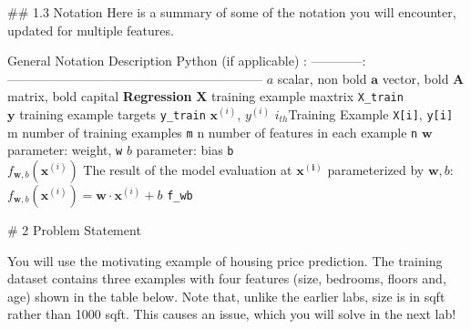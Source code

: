 \documentclass[11pt]{article}
\begin{document}
    \#\# 1.3 Notation Here is a summary of some of the notation you will
encounter, updated for multiple features.

\textbar General Notation \textbar{} Description\textbar{} Python (if
applicable) \textbar{} \textbar: ------------\textbar:
------------------------------------------------------------\textbar\textbar{}
\textbar{} \(a\) \textbar{} scalar, non bold \textbar\textbar{}
\textbar{} \(\mathbf{a}\) \textbar{} vector, bold \textbar\textbar{}
\textbar{} \(\mathbf{A}\) \textbar{} matrix, bold capital
\textbar\textbar{} \textbar{} \textbf{Regression} \textbar{} \textbar{}
\textbar{} \textbar{} \textbar{} \(\mathbf{X}\) \textbar{} training
example maxtrix \textbar{} \texttt{X\_train} \textbar{}\\
\textbar{} \(\mathbf{y}\) \textbar{} training example targets \textbar{}
\texttt{y\_train} \textbar{} \(\mathbf{x}^{(i)}\), \(y^{(i)}\)
\textbar{} \(i_{th}\)Training Example \textbar{} \texttt{X{[}i{]}},
\texttt{y{[}i{]}}\textbar{} \textbar{} m \textbar{} number of training
examples \textbar{} \texttt{m}\textbar{} \textbar{} n \textbar{} number
of features in each example \textbar{} \texttt{n}\textbar{} \textbar{}
\(\mathbf{w}\) \textbar{} parameter: weight, \textbar{} \texttt{w}
\textbar{} \textbar{} \(b\) \textbar{} parameter: bias \textbar{}
\texttt{b} \textbar{}\\
\textbar{} \(f_{\mathbf{w},b}(\mathbf{x}^{(i)})\) \textbar{} The result
of the model evaluation at \(\mathbf{x^{(i)}}\) parameterized by
\(\mathbf{w},b\):
\(f_{\mathbf{w},b}(\mathbf{x}^{(i)}) = \mathbf{w} \cdot \mathbf{x}^{(i)}+b\)
\textbar{} \texttt{f\_wb} \textbar{}

    \# 2 Problem Statement

You will use the motivating example of housing price prediction. The
training dataset contains three examples with four features (size,
bedrooms, floors and, age) shown in the table below. Note that, unlike
the earlier labs, size is in sqft rather than 1000 sqft. This causes an
issue, which you will solve in the next lab!
\end{document}
